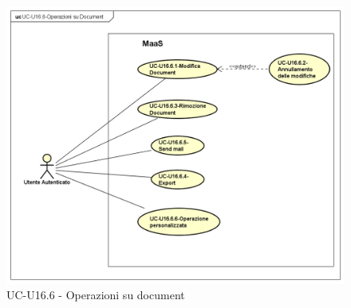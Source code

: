     \begin{figure}[H]
      \begin{center}
        \includegraphics[width=12cm]{res/img/UCUtenti/UCUtenteA/UC-U16.6-Operazioni_su_Document/UC-U16.6-Operazioni_su_Document}
      \caption{UC-U16.6 - Operazioni su document}
      \end{center} 
    \end{figure}

